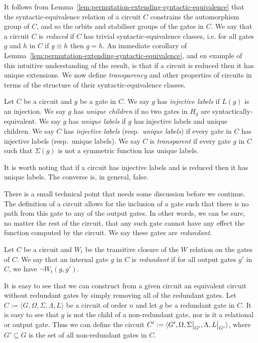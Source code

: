 \documentclass[../paper.tex]{subfiles}
\begin{document}
It follows from Lemma~\ref{lem:permutation-extending-syntactic-equivalence} that
the syntactic-equivalence relation of a circuit $C$ constrains the automorphism
group of $C$, and so the orbits and stabiliser groups of the gates in $C$. We
say that a circuit $C$ is \emph{reduced} if $C$ has trivial
syntactic-equivalence classes, i.e. for all gates $g$ and $h$ in $C$ if $g
\equiv h$ then $g = h$. An immediate corollary of
Lemma~\ref{lem:permutation-extending-syntactic-equivalence}, and en example of
this intuitive understanding of the result, is that if a circuit is reduced then
it has unique extensions. We now define \emph{transparency} and other properties
of circuits in terms of the structure of their syntactic-equivalence classes.

\begin{definition}
  Let $C$ be a circuit and $g$ be a gate in $C$. We say $g$ has \emph{injective
    labels} if $L(g)$ is an injection. We say $g$ has \emph{unique children} if
  no two gates in $H_g$ are syntactically-equivalent. We say $g$ has
  \emph{unique labels} if $g$ has injective labels and unique children. We say
  $C$ has \emph{injective labels} (resp.\ \emph{unique labels}) if every gate in
  $C$ has injective labels (resp.\ unique labels). We say $C$ is
  \emph{transparent} if every gate $g$ in $C$ such that $\Sigma(g)$ is not a
  symmetric function has unique labels.
\end{definition}

It is worth noting that if a circuit has injective labels and is reduced 
then it has unique labels. The converse is, in general, false.

There is a small technical point that needs some discussion before we continue.
The definition of a circuit allows for the inclusion of a gate such that there
is no path from this gate to any of the output gates. In other words, we can be
sure, no matter the rest of the circuit, that any such gate cannot have any
effect the function computed by the circuit. We say these gates are
\emph{redundant}.

\begin{definition}
  Let $C$ be a circuit and $W_t$ be the transitive closure of the $W$ relation
  on the gates of $C$. We say that an internal gate $g$ in $C$ is
  \emph{redundant} if for all output gates $g'$ in $C$, we have $\neg W_t (g,
  g')$.
\end{definition}

It is easy to see that we can construct from a given circuit an equivalent
circuit without redundant gates by simply removing all of the redundant gates.
Let $C := \langle G, \Omega, \Sigma, \Lambda, L \rangle$ be a circuit of order
$n$ and let $g$ be a redundant gate in $C$.  It is easy to see that $g$ is not
the child of a non-redundant gate, nor is it a relational or output gate. Thus
we can define the circuit $C' := \langle G', \Omega, \restr{\Sigma}{G'},
\Lambda, \restr{L}{G'} \rangle$, where $G' \subseteq G$ is the set of all
non-redundant gates in $C$.
\end{document}
